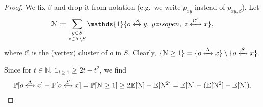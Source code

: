 \documentclass[11pt,a4paper]{article}
\numberwithin{equation}{section}
\theoremstyle{plain}
\theoremstyle{definition}
\newcommand{\connect}{\xleftrightarrow}
\begin{document}
\begin{proof} We fix $\beta$ and drop it from notation (e.g.~we write $p_{xy}$ instead of $p_{xy,\beta}$). Let
\begin{equation}
	\mathcal N:=\sum_{\substack{y\in S\\z\in \Lambda \setminus S}}\mathds{1}\{o\connect{S}y, \: yz \textup{ is open}, \: z \connect{\mathcal C^c\:}x\},
\end{equation}
where $\mathcal C$ is the (vertex) cluster of $o$ in $S$. Clearly,
$
	\{\mathcal N\geq 1\}= \{o\connect{\Lambda\:}x\}\setminus \{o\connect{S\:}x\}.
$

Since for $t\in \mathbb N$, $\mathds{1}_{t\geq 1}\ge 2t-t^2$, we find
\begin{equation}\label{eq:proofSL1}
\mathbb P[o\connect{\Lambda\:}x]-\mathbb P[o\connect{S\:}x]=\mathbb P[\mathcal N\geq 1]\geq 2\mathbb E[\mathcal N]-\mathbb E[\mathcal N^2]=\mathbb E[\mathcal N]-(\mathbb E[\mathcal N^2]-\mathbb E[\mathcal N]).
\end{equation}

\end{proof}
\end{document}
